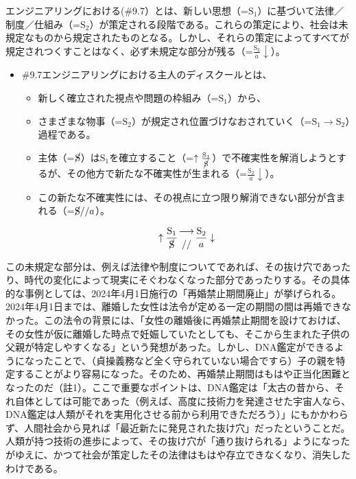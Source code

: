エンジニアリングにおける(\#9.7）とは、新しい思想（=\(\textrm{S}_1\)）に基づいて法律／制度／仕組み（=\(\textrm{S}_2\)）が策定される段階である。これらの策定により、社会は未規定なものから規定されたものとなる。しかし、それらの策定によってすべてが規定されつくすことはなく、必ず未規定な部分が残る（=\(\frac{\textrm{S}_2}{a}\downarrow\)）。

\begin{note}{}
  \begin{itemize}
    \tightlist
    \item{\#9.7}エンジニアリングにおける主人のディスクールとは、
      \begin{itemize}
        \tightlist
        \item 新しく確立された視点や問題の枠組み（=$\textrm{S}_1$）から、
        \item さまざまな物事（=$\textrm{S}_2$）が規定され位置づけなおされていく（=$\textrm{S}_1\rightarrow\textrm{S}_2$）過程である。
        \item 主体（=$\cancel{\textrm{S}}$）は$\textrm{S}_1$を確立すること（=$\uparrow\frac{\mathrm{S_1}}{\cancel{\textrm{S}}}$）で不確実性を解消しようとするが、その他方で新たな不確実性が生まれる（=$\frac{\mathrm{S_2}}{a}\downarrow$）。
        \item この新たな不確実性には、その視点に立つ限り解消できない部分が含まれる（=$\cancel{\textrm{S}}//a$）。
      \end{itemize}

$$
\uparrow\frac{\mathrm{S_1}}{\cancel{\textrm{S}}}\genfrac{}{}{0pt}{}{\longrightarrow}{//}\frac{\mathrm{S_2}}{a}\downarrow
$$
  \end{itemize}
\end{note}

この未規定な部分は、例えば法律や制度についてであれば、その抜け穴であったり、時代の変化によって現実にそぐわなくなった部分であったりする。その具体的な事例としては、2024年4月1日施行の「再婚禁止期間廃止」が挙げられる。2024年4月1日までは、離婚した女性は法令が定める一定の期間の間は再婚できなかった。この法令の背景には、「女性の離婚後に再婚禁止期間を設けておけば、その女性が仮に離婚した時点で妊娠していたとしても、そこから生まれた子供の父親が特定しやすくなる」という発想があった。しかし、DNA鑑定ができるようになったことで、（貞操義務など全く守られていない場合ですら）子の親を特定することがより容易になった。そのため、再婚禁止期間はもはや正当化困難となったのだ（註1）。ここで重要なポイントは、DNA鑑定は「太古の昔から、それ自体としては可能であった（例えば、高度に技術力を発達させた宇宙人なら、DNA鑑定は人類がそれを実用化させる前から利用できただろう）」にもかかわらず、人間社会から見れば「最近新たに発見された抜け穴」だったということだ。人類が持つ技術の進歩によって、その抜け穴が「通り抜けられる」ようになったがゆえに、かつて社会が策定したその法律はもはや存立できなくなり、消失したわけである。

